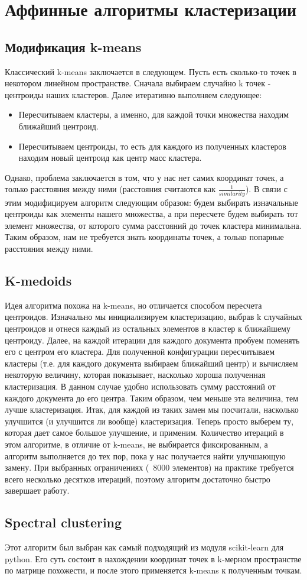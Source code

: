 \section{Аффинные алгоритмы кластеризации}
\subsection{Модификация k-means}
Классический k-means заключается в следующем. Пусть есть сколько-то точек в некотором линейном пространстве. Сначала выбираем случайно k точек - центроиды наших кластеров. Далее итеративно выполняем следующее:
\begin{itemize}
\item Пересчитываем кластеры, а именно, для каждой точки множества находим ближайший центроид.
\item Пересчитываем центроиды, то есть для каждого из полученных кластеров находим новый центроид как центр масс кластера.
\end{itemize}
Однако, проблема заключается в том, что у нас нет самих координат точек, а только расстояния между ними (расстояния считаются как $\frac{1}{similarity}$). В связи с этим модифицируем алгоритм следующим образом: будем выбирать изначальные центроиды как элементы нашего множества, а при пересчете будем выбирать тот элемент множества, от которого сумма расстояний до точек кластера минимальна. Таким образом, нам не требуется знать координаты точек, а только попарные расстояния между ними. \newline

\subsection{K-medoids}
Идея алгоритма похожа на k-means, но отличается способом пересчета центроидов. Изначально мы инициализируем кластеризацию, выбрав k случайных центроидов и отнеся каждый из остальных элементов в кластер к ближайшему центроиду. Далее, на каждой итерации для каждого документа пробуем поменять его с центром его кластера. Для полученной конфигурации пересчитываем кластеры (т.е. для каждого документа выбираем ближайший центр) и вычисляем некоторую величину, которая показывает, насколько хороша полученная кластеризация. В данном случае удобно использовать сумму расстояний от каждого документа до его центра. Таким образом, чем меньше эта величина, тем лучше кластеризация.
Итак, для каждой из таких замен мы посчитали, насколько улучшится (и улучшится ли вообще) кластеризация. Теперь просто выберем ту, которая дает самое большое улучшение, и применим. \newline
Количество итераций в этом алгоритме, в отличие от k-means, не выбирается фиксированным, а алгоритм выполняется до тех пор, пока у нас получается найти улучшающую замену. При выбранных ограничениях (~8000 элементов) на практике требуется всего несколько десятков итераций, поэтому алгоритм достаточно быстро завершает работу.

\subsection{Spectral clustering}
Этот алгоритм был выбран как самый подходящий из модуля scikit-learn для python. Его суть состоит в нахождении координат точек в k-мерном пространстве по матрице похожести, и после этого применяется k-means к полученным точкам.
